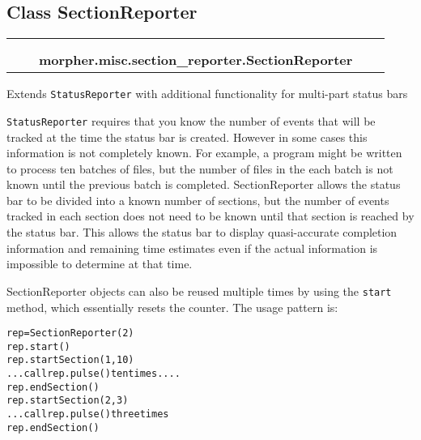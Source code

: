 
\subsection{Class SectionReporter}

    \label{morpher:misc:section_reporter:SectionReporter}
\begin{tabular}{cccccc}
\multicolumn{2}{r}{\settowidth{\BCL}{object}\multirow{2}{\BCL}{object}}
&&
  \\\cline{3-3}
  &&\multicolumn{1}{c|}{}
&&
  \\
&&\multicolumn{2}{l}{\textbf{morpher.misc.section\_reporter.SectionReporter}}
\end{tabular}

Extends \texttt{StatusReporter} with additional functionality for 
multi-part status bars

\texttt{StatusReporter} requires that you know the number of events that 
will be tracked at the time the status bar is created. However in some 
cases this information is not completely known. For example, a program 
might be written to process ten batches of files, but the number of files 
in the each batch is not known until the previous batch is completed. 
SectionReporter allows the status bar to be divided into a known number of 
sections, but the number of events tracked in each section does not need to
be known until that section is reached by the status bar. This allows the 
status bar to display quasi-accurate completion information and remaining 
time estimates even if the actual information is impossible to determine at
that time.

SectionReporter objects can also be reused multiple times by using the 
\texttt{start} method, which essentially resets the counter. The usage 
pattern is:

\begin{alltt}
   rep = SectionReporter(2)
   rep.start()
   rep.startSection(1, 10)
   ...call rep.pulse() ten times....
   rep.endSection()
   rep.startSection(2, 3)
   ...call rep.pulse() three times
   rep.endSection()\end{alltt}


